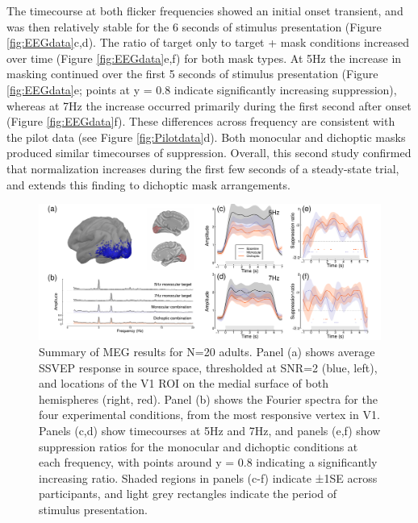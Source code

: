 \documentclass[
]{article}
\begin{document}
The timecourse at both flicker frequencies showed an initial onset transient, and was then relatively stable for the 6 seconds of stimulus presentation (Figure \ref{fig:EEGdata}c,d). The ratio of target only to target + mask conditions increased over time (Figure \ref{fig:EEGdata}e,f) for both mask types. At 5Hz the increase in masking continued over the first 5 seconds of stimulus presentation (Figure \ref{fig:EEGdata}e; points at y = 0.8 indicate significantly increasing suppression), whereas at 7Hz the increase occurred primarily during the first second after onset (Figure \ref{fig:EEGdata}f). These differences across frequency are consistent with the pilot data (see Figure \ref{fig:Pilotdata}d). Both monocular and dichoptic masks produced similar timecourses of suppression. Overall, this second study confirmed that normalization increases during the first few seconds of a steady-state trial, and extends this finding to dichoptic mask arrangements.

\begin{figure}

{\centering \includegraphics{Figures/MEGdata} 

}

\caption{Summary of MEG results for N=20 adults. Panel (a) shows average SSVEP response in source space, thresholded at SNR=2 (blue, left), and locations of the V1 ROI on the medial surface of both hemispheres (right, red). Panel (b) shows the Fourier spectra for the four experimental conditions, from the most responsive vertex in V1. Panels (c,d) show timecourses at 5Hz and 7Hz, and panels (e,f) show suppression ratios for the monocular and dichoptic conditions at each frequency, with points around y = 0.8 indicating a significantly increasing ratio. Shaded regions in panels (c-f) indicate ±1SE across participants, and light grey rectangles indicate the period of stimulus presentation.}\label{fig:MEGdata}
\end{figure}
\end{document}

